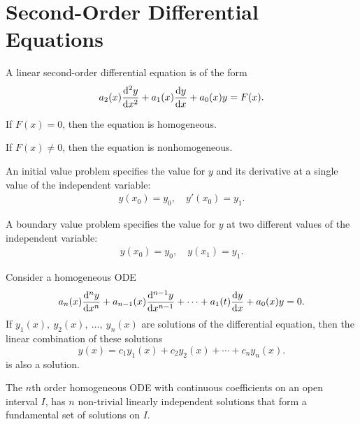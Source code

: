 \documentclass{article}
\begin{document}
\section{Second-Order Differential Equations}
A linear second-order differential equation is of the form
\begin{equation*}
    a_2(x)\dv[2]{y}{x}+ a_1(x)\dv{y}{x} + a_0(x)y = F(x).
\end{equation*}
\begin{description}
    \item If $F(x) = 0$, then the equation is homogeneous.
    \item If $F(x) \neq 0$, then the equation is nonhomogeneous.
\end{description}
\begin{definition}
    An initial value problem specifies the value for $y$ and its derivative at a single value of the independent variable:
    \begin{align*}
        y(x_0) = y_0, \quad y'(x_0) = y_1.
    \end{align*}
\end{definition}
\begin{definition}
    A boundary value problem specifies the value for $y$ at two different values of the independent variable:
    \begin{align*}
        y(x_0) = y_0, \quad y(x_1) = y_1.
    \end{align*}
\end{definition}
\begin{theorem}
    Consider a homogeneous ODE
    \begin{equation*}
        a_n(x)\dv[n]{y}{x} + a_{n-1}(x)\dv[n-1]{y}{x} + \cdots + a_1(t)\dv{y}{x} + a_0(x)y = 0.
    \end{equation*}
    If $y_1(x),\: y_2(x),\: \dots ,\: y_n(x)$ are solutions of the differential equation, then
    the linear combination of these solutions
    \begin{equation*}
        y(x) = c_1 y_1(x) + c_2 y_2(x) + \cdots + c_n y_n(x).
    \end{equation*}
    is also a solution.
\end{theorem}
\begin{theorem}
    The $n$th order homogeneous ODE with \linebreak continuous coefficients on an open interval $I$,
    has $n$ non-trivial linearly independent solutions that form
    a fundamental set of solutions on $I$.
\end{theorem}
\end{document}
